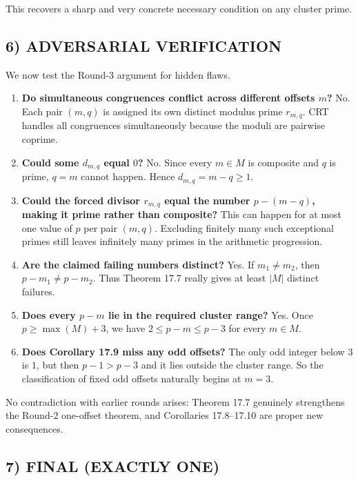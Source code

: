 This recovers a sharp and very concrete necessary condition on any cluster prime.

\subsection*{6) ADVERSARIAL VERIFICATION}

We now test the Round-3 argument for hidden flaws.

\begin{enumerate}
\item \textbf{Do simultaneous congruences conflict across different offsets $m$?}  
No. Each pair $(m,q)$ is assigned its own distinct modulus prime $r_{m,q}$. CRT handles all congruences simultaneously because the moduli are pairwise coprime.

\item \textbf{Could some $d_{m,q}$ equal $0$?}  
No. Since every $m\in M$ is composite and $q$ is prime, $q=m$ cannot happen. Hence $d_{m,q}=m-q\ge 1$.

\item \textbf{Could the forced divisor $r_{m,q}$ equal the number $p-(m-q)$, making it prime rather than composite?}  
This can happen for at most one value of $p$ per pair $(m,q)$. Excluding finitely many such exceptional primes still leaves infinitely many primes in the arithmetic progression.

\item \textbf{Are the claimed failing numbers distinct?}  
Yes. If $m_1\neq m_2$, then $p-m_1\neq p-m_2$. Thus Theorem 17.7 really gives at least $|M|$ distinct failures.

\item \textbf{Does every $p-m$ lie in the required cluster range?}  
Yes. Once $p\ge \max(M)+3$, we have $2\le p-m\le p-3$ for every $m\in M$.

\item \textbf{Does Corollary 17.9 miss any odd offsets?}  
The only odd integer below $3$ is $1$, but then $p-1>p-3$ and it lies outside the cluster range. So the classification of fixed odd offsets naturally begins at $m=3$.
\end{enumerate}

No contradiction with earlier rounds arises: Theorem 17.7 genuinely strengthens the Round-2 one-offset theorem, and Corollaries 17.8--17.10 are proper new consequences.

\subsection*{7) FINAL (EXACTLY ONE)}

